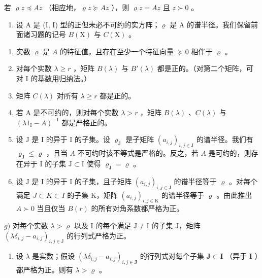 若 \(\varrho z \preccurlyeq Az\) （相应地，\(\varrho z \succcurlyeq Az\) ），则 \(\varrho z = Az\) 且 \(z \succ 0\) 。

\begin{enumerate}
\def\labelenumi{\arabic{enumi})}
\setcounter{enumi}{19}
\tightlist
\item
  设 A 是 (I, I) 型的正但未必不可约的实方阵；\(\varrho\) 是 A 的谱半径。我们保留前面诸习题的记号 \(B(\mathrm{X})\) 与 \(C(\mathrm{X})\) 。
\end{enumerate}

\begin{enumerate}
\def\labelenumi{\alph{enumi})}
\item
  实数 \(\varrho\) 是 \(A\) 的特征值，且存在至少一个特征向量 \(\succcurlyeq 0\) 相伴于 \(\varrho\) 。
\item
  对每个实数 \(\lambda \geqslant r\) ，矩阵 \(B(\lambda)\) 与 \(B'(\lambda)\) 都是正的。（对第二个矩阵，可对 I 的基数用归纳法。）
\item
  矩阵 \(C(\lambda)\) 对所有 \(\lambda \geqslant r\) 都是正的。
\item
  若 A 是不可约的，则对每个实数 \(\lambda > r\) ，矩阵 \(B(\lambda)\) 、\(C(\lambda)\) 与 \((\lambda1_{\mathrm{I}} - A)^{-1}\) 都是严格正的。
\item
  设 J 是 I 的异于 I 的子集。设 \(\varrho_{\mathrm{J}}\) 是子矩阵 \((a_{i,j})_{i,j\in \mathrm{J}}\) 的谱半径。我们有 \(\varrho_{\mathrm{J}}\leqslant \varrho\) ，且当 \(A\) 不可约时该不等式是严格的。反之，若 \(A\) 是可约的，则存在异于 I 的子集 \(\mathrm{J}\subset \mathrm{I}\) 使得 \(\varrho_{\mathrm{J}} = \varrho\) 。
\item
  设 J 是 I 的异于 I 的子集，且子矩阵 \((a_{i,j})_{i,j\in\mathrm{J}}\) 的谱半径等于 \(\varrho\) 。对每个满足 \(J\subset K\subset I\) 的子集 K，矩阵 \((a_{i,j})_{i,j\in\mathrm{K}}\) 的谱半径等于 \(\varrho\) 。由此推出 \(A\succ0\) 当且仅当 \(B(r)\) 的所有对角系数都严格为正。
\end{enumerate}

\(g)\) 对每个实数 \(\lambda >\varrho\) 以及 I 的每个满足 \(\mathrm{J}\neq \mathrm{I}\) 的子集 J，矩阵 \((\lambda \delta_{i,j} - a_{i,j})_{i,j\in \mathrm{J}}\) 的行列式严格为正。

\begin{enumerate}
\def\labelenumi{\alph{enumi})}
\setcounter{enumi}{7}
\tightlist
\item
  设 \(\lambda\) 是实数；假设 \((\lambda \delta_{i,j} - a_{i,j})_{i,j \in \mathbf{J}}\) 的行列式对每个子集 \(\mathbf{J} \subset \mathbf{I}\) （异于 \(\mathbf{I}\) ）都严格为正。则有 \(\lambda > \varrho\) 。
\end{enumerate}

